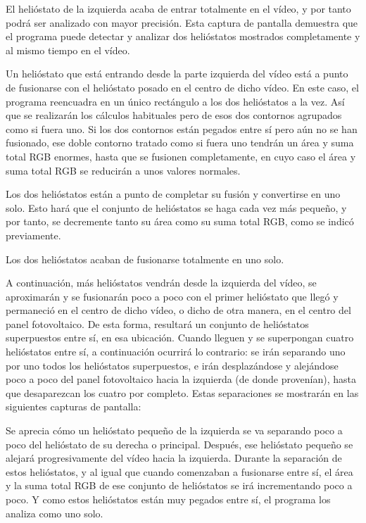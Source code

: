 \documentclass[12pt]{article}
\begin{document}
El helióstato de la izquierda acaba de entrar totalmente en el vídeo, y por tanto podrá ser analizado con mayor precisión. Esta captura de pantalla demuestra que el programa puede detectar y analizar dos helióstatos mostrados completamente y al mismo tiempo en el vídeo.




Un helióstato que está entrando desde la parte izquierda del vídeo está a punto de fusionarse con el helióstato posado en el centro de dicho vídeo. En este caso, el programa reencuadra en un único rectángulo a los dos helióstatos a la vez. Así que se realizarán los cálculos habituales pero de esos dos contornos agrupados como si fuera uno. Si los dos contornos están pegados entre sí pero aún no se han fusionado, ese doble contorno tratado como si fuera uno tendrán un área y suma total RGB enormes, hasta que se fusionen completamente, en cuyo caso el área y suma total RGB se reducirán a unos valores normales.




Los dos helióstatos están a punto de completar su fusión y convertirse en uno solo. Esto hará que el conjunto de helióstatos se haga cada vez más pequeño, y por tanto, se decremente tanto su área como su suma total RGB, como se indicó previamente.




Los dos helióstatos acaban de fusionarse totalmente en uno solo.

A continuación, más helióstatos vendrán desde la izquierda del vídeo, se aproximarán y se fusionarán poco a poco con el primer helióstato que llegó y permaneció en el centro de dicho vídeo, o dicho de otra manera, en el centro del panel fotovoltaico. De esta forma, resultará un conjunto de helióstatos superpuestos entre sí, en esa ubicación. Cuando lleguen y se superpongan cuatro helióstatos entre sí, a continuación ocurrirá lo contrario: se irán separando uno por uno todos los helióstatos superpuestos, e irán desplazándose y alejándose poco a poco del panel fotovoltaico hacia la izquierda (de donde provenían), hasta que desaparezcan los cuatro por completo. Estas separaciones se mostrarán en las siguientes capturas de pantalla:



Se aprecia cómo un helióstato pequeño de la izquierda se va separando poco a poco del helióstato de su derecha o principal. Después, ese helióstato pequeño se alejará progresivamente del vídeo hacia la izquierda. Durante la separación de estos helióstatos, y al igual que cuando comenzaban a fusionarse entre sí, el área y la suma total RGB de ese conjunto de helióstatos se irá incrementando poco a poco. Y como estos helióstatos están muy pegados entre sí, el programa los analiza como uno solo.
\end{document}
